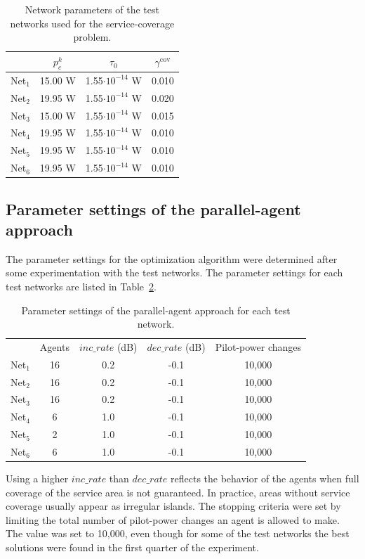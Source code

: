 \begin{table}
\caption{Network parameters of the test networks used for the service-coverage
problem.\emph{\label{tab:06-Test_network_parameters}}}


\centering

\begin{tabular}{cccc}
\hline 
 & $p_{c}^{k}$ & $\tau_{0}$ & $\gamma^{\mathrm{cov}}$\tabularnewline
\hline 
Net$_{1}$ & 15.00 W & 1.55$\cdot10^{-14}$ W & 0.010\tabularnewline
Net$_{2}$ & 19.95 W & 1.55$\cdot10^{-14}$ W & 0.020\tabularnewline
Net$_{3}$ & 15.00 W & 1.55$\cdot10^{-14}$ W & 0.015\tabularnewline
Net$_{4}$ & 19.95 W & 1.55$\cdot10^{-14}$ W & 0.010\tabularnewline
Net$_{5}$ & 19.95 W & 1.55$\cdot10^{-14}$ W & 0.010\tabularnewline
Net$_{6}$ & 19.95 W & 1.55$\cdot10^{-14}$ W & 0.010\tabularnewline
\hline 
\end{tabular}
\end{table}



\subsection{Parameter settings of the parallel-agent approach \label{sub:06-Algorithm_parameter_settings}}

The parameter settings for the optimization algorithm were determined
after some experimentation with the test networks. The parameter settings
for each test networks are listed in Table~\ref{tab:06-Parameter_settings}.

\begin{table}
\caption{Parameter settings of the parallel-agent approach for each test network.\emph{\label{tab:06-Parameter_settings}}}


\centering

\begin{tabular}{ccccc}
\toprule 
 & Agents & $inc\_rate$ (dB) & $dec\_rate$ (dB) & Pilot-power changes\tabularnewline\addlinespace
\midrule
Net$_{1}$ & 16 & 0.2 & -0.1 & 10,000\tabularnewline
Net$_{2}$ & 16 & 0.2 & -0.1 & 10,000\tabularnewline
Net$_{3}$ & 16 & 0.2 & -0.1 & 10,000\tabularnewline
Net$_{4}$ & 6 & 1.0 & -0.1 & 10,000\tabularnewline
Net$_{5}$ & 2 & 1.0 & -0.1 & 10,000\tabularnewline
Net$_{6}$ & 6 & 1.0 & -0.1 & 10,000\tabularnewline
\bottomrule
\end{tabular}
\end{table}


Using a higher $inc\_rate$ than $dec\_rate$ reflects the behavior
of the agents when full coverage of the service area is not guaranteed.
In practice, areas without service coverage usually appear as irregular
islands. The stopping criteria were set by limiting the total number
of pilot-power changes an agent is allowed to make. The value was
set to 10,000, even though for some of the test networks the best
solutions were found in the first quarter of the experiment.


